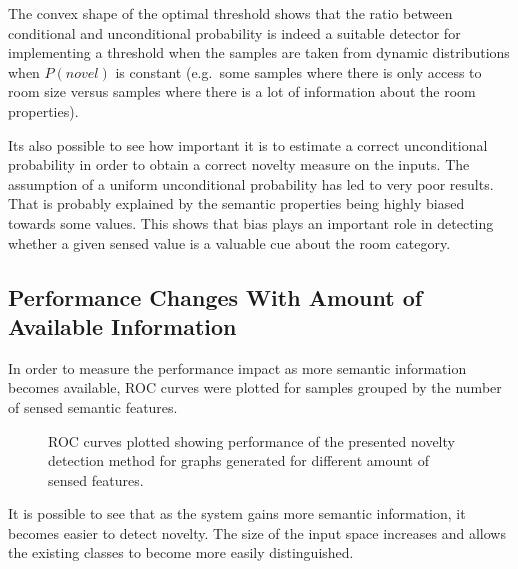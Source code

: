 \documentclass[runningheads,a4paper]{llncs}
\begin{document}
The convex shape of the optimal threshold shows that the ratio between conditional
and unconditional probability is indeed a suitable detector for implementing a threshold when
the samples are taken from dynamic distributions when $P(novel)$ is constant
(e.g.\ some samples where there is only access to room size versus
samples where there is a lot of information about the room properties).

Its also possible to see how important it is to estimate a correct unconditional
probability in order to obtain a correct novelty measure on the inputs.
The assumption of a uniform unconditional probability has led to very poor results.
That is probably explained by the semantic properties being highly
biased towards some values. This shows that bias plays an important role
in detecting whether a given sensed value is a valuable cue about the room category.



\subsection{Performance Changes With Amount of Available Information}
In order to measure the performance impact as more semantic information becomes
available, ROC curves were plotted for samples grouped by the number of sensed
semantic features.

\begin{figure}[h]
\centering

\qquad
{}

\qquad
{}

\caption{\label{fig:synthetic-roc-breakdown}ROC curves plotted showing performance of the
         presented novelty detection method for graphs generated for different amount of
         sensed features.}
\end{figure}

It is possible to see that as the system gains more semantic information, it
becomes easier to detect novelty. The size of the input space increases and allows the
existing classes to become more easily distinguished.
\end{document}
